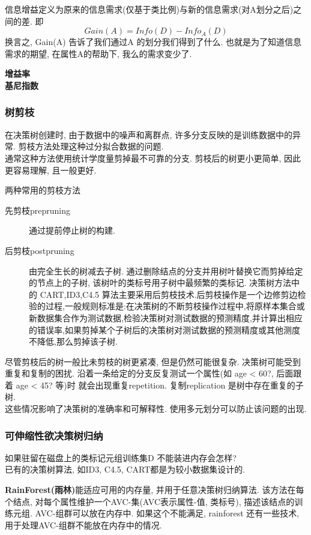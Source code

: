\documentclass{article}
\begin{document}
信息增益定义为原来的信息需求(仅基于类比例)与新的信息需求(对A划分之后)之间的差. 即
$$
Gain(A) = Info(D) - Info_A(D)
$$
换言之, Gain(A) 告诉了我们通过A 的划分我们得到了什么. 也就是为了知道信息需求的期望, 在属性A的帮助下, 我么的需求变少了.

\textbf{增益率}\\

\textbf{基尼指数}\\

\subsubsection{树剪枝}
在决策树创建时, 由于数据中的噪声和离群点, 许多分支反映的是训练数据中的异常. 剪枝方法处理这种过分拟合数据的问题.\\
通常这种方法使用统计学度量剪掉最不可靠的分支. 剪枝后的树更小更简单, 因此更容易理解, 且一般更好.

两种常用的剪枝方法
\begin{description}
\item [先剪枝prepruning] 通过提前停止树的构建.
\item [后剪枝postpruning] 由完全生长的树减去子树. 通过删除结点的分支并用树叶替换它而剪掉给定的节点上的子树, 该树叶的类标号用子树中最频繁的类标记.
		决策树方法中的 CART,ID3,C4.5 算法主要采用后剪枝技术.后剪枝操作是一个边修剪边检验的过程,一般规则标准是:在决策树的不断剪枝操作过程中,将原样本集合或新数据集合作为测试数据,检验决策树对测试数据的预测精度,并计算出相应的错误率,如果剪掉某个子树后的决策树对测试数据的预测精度或其他测度不降低,那么剪掉该子树.
\end{description}

尽管剪枝后的树一般比未剪枝的树更紧凑, 但是仍然可能很复杂. 决策树可能受到重复和复制的困扰. 沿着一条给定的分支反复测试一个属性(如 age < 60?, 后面跟着 age < 45? 等)时
就会出现重复repetition. 复制replication 是树中存在重复的子树.\\
这些情况影响了决策树的准确率和可解释性. 使用多元划分可以防止该问题的出现.

\subsubsection{可伸缩性欲决策树归纳}
如果驻留在磁盘上的类标记元组训练集D 不能装进内存会怎样?\\
已有的决策树算法, 如ID3, C4.5, CART都是为较小数据集设计的.

\textbf{RainForest(雨林)}能适应可用的内存量, 并用于任意决策树归纳算法. 该方法在每个结点, 对每个属性维护一个AVC-集(AVC表示属性-值, 类标号), 描述该结点的训练元组.
AVC-组群可以放在内存中. 如果这个不能满足, rainforest 还有一些技术, 用于处理AVC-组群不能放在内存中的情况.
\end{document}
